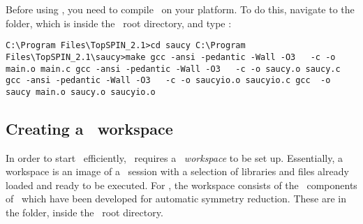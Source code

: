 Before using \topspin, you need to compile \saucy\ on your platform.
To do this, navigate to the  folder, which is inside
the \topspin\ root directory, and type :
%
\begin{lstlisting}
C:\Program Files\TopSPIN_2.1>cd saucy C:\Program
Files\TopSPIN_2.1\saucy>make gcc -ansi -pedantic -Wall -O3   -c -o
main.o main.c gcc -ansi -pedantic -Wall -O3   -c -o saucy.o saucy.c
gcc -ansi -pedantic -Wall -O3   -c -o saucyio.o saucyio.c gcc  -o
saucy main.o saucy.o saucyio.o
\end{lstlisting}
%
\subsection{Creating a \protect\gap\ workspace}\label{sec:downloadandinstall:gapworkspace}
%
In order to start \gap\ efficiently, \topspin\ requires a \gap\
\emph{workspace} to be set up.  Essentially, a workspace is an image
of a \gap\ session with a selection of libraries and files already
loaded and ready to be executed.  For \topspin, the workspace
consists of the \gap\ components of \topspin\ which have been
developed for automatic symmetry reduction.  These are in the
 folder, inside the \topspin\ root directory.

